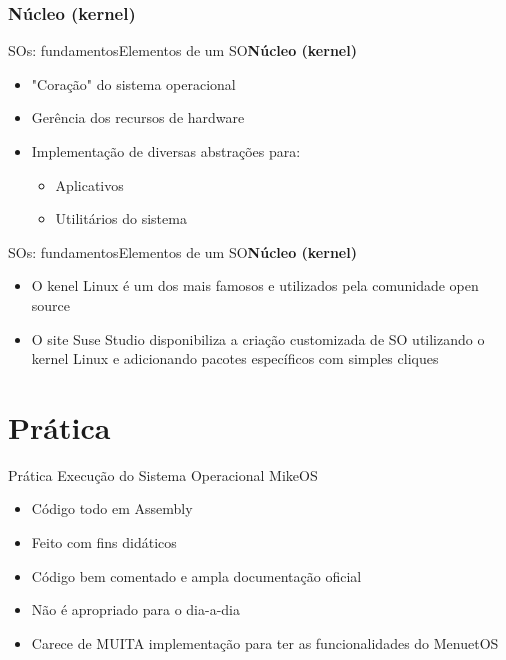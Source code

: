 \documentclass{beamer}
\begin{document}
      \subsubsection{Núcleo (kernel)}
        
        \begin{frame}{SOs: fundamentos}{Elementos de um SO}{\bfseries{Núcleo (kernel)}}
          \begin{itemize}
            \item "Coração" do sistema operacional
            \item Gerência dos recursos de hardware
            \item Implementação de diversas abstrações para:
            \begin{itemize}
              \item Aplicativos
              \item Utilitários do sistema
            \end{itemize} 
          \end{itemize}
        \end{frame}

        \begin{frame}{SOs: fundamentos}{Elementos de um SO}{\bfseries{Núcleo (kernel)}}
          \begin{itemize}
            \item O kenel Linux é um dos mais famosos e utilizados pela comunidade open source
            \item O site Suse Studio disponibiliza a criação customizada de SO utilizando o kernel Linux e adicionando pacotes específicos com simples cliques
          \end{itemize}
        \end{frame}
  \section{Prática}
    \begin{frame}{Prática}
      Execução do Sistema Operacional MikeOS
      \begin{itemize}
        \item Código todo em Assembly
        \item Feito com fins didáticos
        \item Código bem comentado e ampla documentação oficial
        \item Não é apropriado para o dia-a-dia
        \item Carece de MUITA implementação para ter as funcionalidades do MenuetOS
      \end{itemize}
    \end{frame}
  
\end{document}
